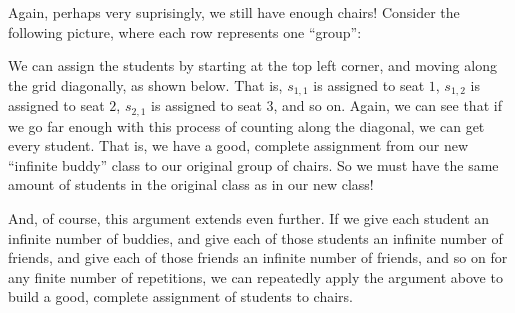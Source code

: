 Again, perhaps very suprisingly, we still have enough chairs!
Consider the following picture, where each row represents one ``group'':


We can assign the students by starting at the top left corner, and moving along the grid diagonally, as shown below.
That is, $s_{1,1}$ is assigned to seat $1$, $s_{1,2}$ is assigned to seat $2$, $s_{2,1}$ is assigned to seat $3$, and so on.
Again, we can see that if we go far enough with this process of counting along the diagonal, we can get every student.
That is, we have a good, complete assignment from our new ``infinite buddy'' class to our original group of chairs.
So we must have the same amount of students in the original class as in our new class!

And, of course, this argument extends even further.
If we give each student an infinite number of buddies, and give each of those students an infinite number of friends, and give each of those friends an infinite number of friends, and so on for any finite number of repetitions, we can repeatedly apply the argument above to build a good, complete assignment of students to chairs.

